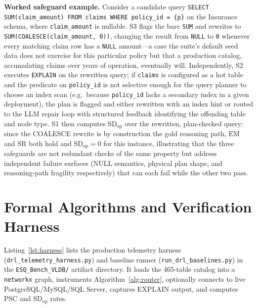\documentclass[twocolumn]{svjour3}
\begin{document}
\textbf{Worked safeguard example.}
Consider a candidate query \texttt{SELECT SUM(claim\_amount) FROM claims WHERE policy\_id = \{p\}} on the Insurance schema, where \texttt{claim\_amount} is nullable.
S3 flags the bare \texttt{SUM} and rewrites to \texttt{SUM(COALESCE(claim\_amount, 0))}, changing the result from \texttt{NULL} to \texttt{0} whenever every matching claim row has a \texttt{NULL} amount---a case the suite's default seed data does not exercise for this particular policy but that a production catalog, accumulating claims over years of operation, eventually will.
Independently, S2 executes \texttt{EXPLAIN} on the rewritten query; if \texttt{claims} is configured as a hot table and the predicate on \texttt{policy\_id} is not selective enough for the query planner to choose an index scan (e.g.\ because \texttt{policy\_id} lacks a secondary index in a given deployment), the plan is flagged and either rewritten with an index hint or routed to the LLM repair loop with structured feedback identifying the offending table and node type.
S1 then computes $\text{SD}_{\text{op}}$ over the rewritten, plan-checked query: since the COALESCE rewrite is by construction the gold reasoning path, $\text{EM}$ and $\text{SR}$ both hold and $\text{SD}_{\text{op}}{=}0$ for this instance, illustrating that the three safeguards are not redundant checks of the same property but address independent failure surfaces (NULL semantics, physical plan shape, and reasoning-path fragility respectively) that can each fail while the other two pass.

\section{Formal Algorithms and Verification Harness}
\label{sec:harness}

Listing~\ref{lst:harness} lists the production telemetry harness (\texttt{drl\_telemetry\_harness.py}) and baseline runner (\texttt{run\_drl\_baselines.py}) in the \texttt{ESQ\_Bench\_VLDB/} artifact directory.
It loads the 465-table catalog into a \texttt{networkx} graph, instruments Algorithm~\ref{alg:router}, optionally connects to live PostgreSQL/MySQL/SQL Server, captures EXPLAIN output, and computes PSC and $\text{SD}_{\text{op}}$ rates.


\end{document}
